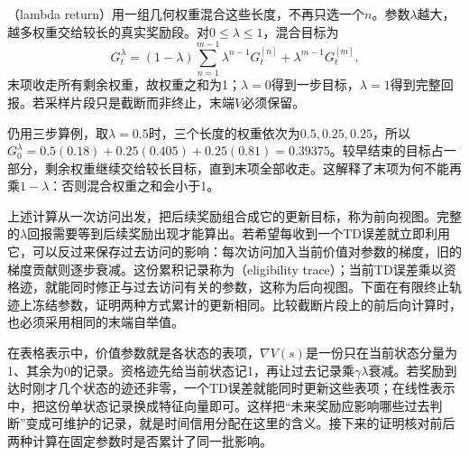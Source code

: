 （lambda return）用一组几何权重混合这些长度，不再只选一个$n$。参数$\lambda$越大，越多权重交给较长的真实奖励段。对$0\leq\lambda\leq1$，混合目标为
\begin{equation}
  G_t^\lambda
    =(1-\lambda)\sum_{n=1}^{m-1}\lambda^{n-1}G_t^{[n]}
                     +\lambda^{m-1}G_t^{[m]} .
  \label{eq:rl-learning-lambda-return}
\end{equation}
末项收走所有剩余权重，故权重之和为1；$\lambda=0$得到一步目标，$\lambda=1$得到完整回报。若采样片段只是截断而非终止，末端$V$必须保留。

仍用三步算例，取$\lambda=0.5$时，三个长度的权重依次为$0.5,0.25,0.25$，所以$G_0^\lambda=0.5(0.18)+0.25(0.405)+0.25(0.81)=0.39375$。较早结束的目标占一部分，剩余权重继续交给较长目标，直到末项全部收走。这解释了末项为何不能再乘$1-\lambda$：否则混合权重之和会小于1。

上述计算从一次访问出发，把后续奖励组合成它的更新目标，称为前向视图。完整的$\lambda$回报需要等到后续奖励出现才能算出。若希望每收到一个TD误差就立即利用它，可以反过来保存过去访问的影响：每次访问加入当前价值对参数的梯度，旧的梯度贡献则逐步衰减。这份累积记录称为（eligibility trace）；当前TD误差乘以资格迹，就能同时修正与过去访问有关的参数，这称为后向视图。下面在有限终止轨迹上冻结参数，证明两种方式累计的更新相同。比较截断片段上的前后向计算时，也必须采用相同的末端自举值。

在表格表示中，价值参数就是各状态的表项，$\nabla V(s)$是一份只在当前状态分量为1、其余为0的记录。资格迹先给当前状态记1，再让过去记录乘$\gamma\lambda$衰减。若奖励到达时刚才几个状态的迹还非零，一个TD误差就能同时更新这些表项；在线性表示中，把这份单状态记录换成特征向量即可。这样把“未来奖励应影响哪些过去判断”变成可维护的记录，就是时间信用分配在这里的含义。接下来的证明核对前后两种计算在固定参数时是否累计了同一批影响。

